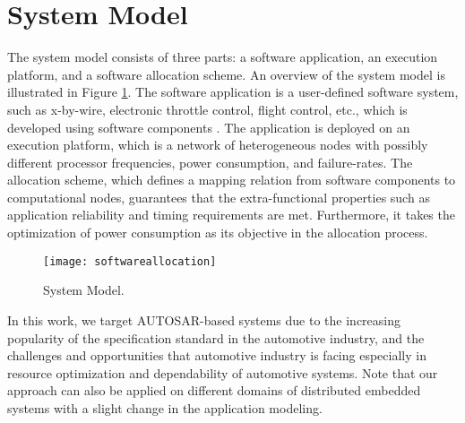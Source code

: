\section{System Model}\label{sec_system}
The system model consists of three parts: a software application, an execution platform, and a software allocation scheme. An overview of the system model is illustrated in Figure \ref{fig_softwareallocation}. The software application is a user-defined software system, such as x-by-wire, electronic throttle control, flight control, etc., which is developed using software components \cite{softwarecomponents}\cite{Crnkovic2002BuildingSystems}. The application is deployed on an execution platform, which is a network of heterogeneous nodes with possibly different processor frequencies, power consumption, and failure-rates. The allocation scheme, which defines a mapping relation from software components to computational nodes, guarantees that the extra-functional properties such as application reliability and timing requirements are met. Furthermore, it takes the optimization of power consumption as its objective in the allocation process.
\begin{figure}[!h]
\centering
\texttt{[image: softwareallocation]}
\caption{System Model.}
\label{fig_softwareallocation}
\end{figure}

In this work, we target AUTOSAR-based systems due to the increasing popularity of the specification standard in  the automotive industry, and the challenges and opportunities that automotive industry is facing especially in resource optimization and dependability of automotive systems. Note that our approach can also be applied on different domains of distributed embedded systems with a slight change in the application modeling.

